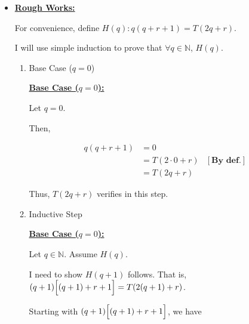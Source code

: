 \documentclass[12pt]{article}
\begin{document}
\begin{itemize}

    \item

    \begin{mdframed}
        \underline{\textbf{Rough Works:}}

        \bigskip

        For convenience, define $H(q): q(q + r + 1) = T(2q+r)$.

        \bigskip

        I will use simple induction to prove that $\forall q \in \mathbb{N}$, $H(q)$.

        \bigskip

        \begin{enumerate}[1.]
            \item Base Case ($q = 0$)

            \begin{mdframed}
            \underline{\textbf{Base Case ($q = 0$):}}

            \bigskip

            Let $q = 0$.

            \bigskip

            Then,

            \begin{align}
                q(q + r + 1) &= 0\\
                &= T(2\cdot 0 + r) & [\textbf{By def.}]\\
                &= T(2q + r)
            \end{align}

            \bigskip

            Thus, $T(2q+r)$ verifies in this step.
            \end{mdframed}

            \item Inductive Step

            \begin{mdframed}
            \underline{\textbf{Base Case ($q = 0$):}}

            \bigskip

            Let $q \in \mathbb{N}$. Assume $H(q)$.

            \bigskip

            I need to show $H(q+1)$ follows. That is, $(q+1)\Bigl[ (q+1) + r + 1 \Bigr] = T(2(q+1) + r)$.

            \bigskip

            Starting with $(q+1)\Bigl[ (q+1) + r + 1 \Bigr]$, we have

            \end{mdframed}
        \end{enumerate}

    \end{mdframed}
\end{itemize}
\end{document}
